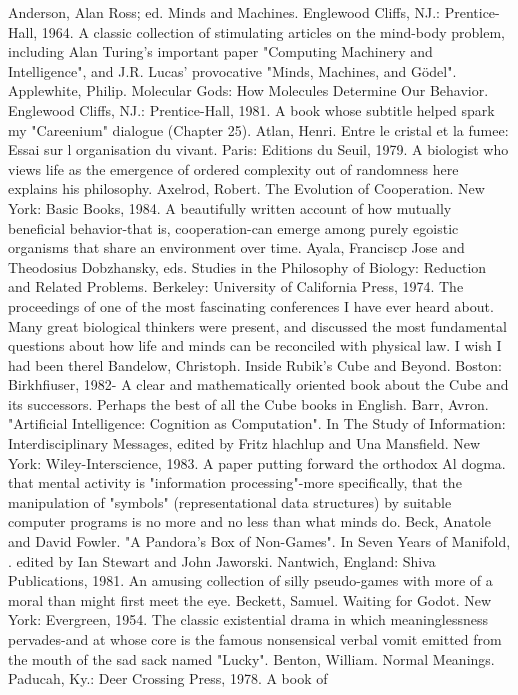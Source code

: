Anderson, Alan Ross; ed. Minds and Machines. Englewood Cliffs, NJ.: Prentice-Hall, 1964.
 A classic collection of stimulating articles on the mind-body problem, including Alan
 Turing's important paper "Computing Machinery and Intelligence", and J.R. Lucas'
 provocative "Minds, Machines, and Gödel".
Applewhite, Philip. Molecular Gods: How Molecules Determine Our Behavior. Englewood
 Cliffs, NJ.: Prentice-Hall, 1981. A book whose subtitle helped spark my "Careenium"
 dialogue (Chapter 25).
Atlan, Henri. Entre le cristal et la fumee: Essai sur l organisation du vivant. Paris: Editions du
 Seuil, 1979. A biologist who views life as the emergence of ordered complexity out of
 randomness here explains his philosophy.
Axelrod, Robert. The Evolution of Cooperation. New York: Basic Books, 1984. A beautifully
 written account of how mutually beneficial behavior-that is, cooperation-can emerge among
 purely egoistic organisms that share an environment over time.
Ayala, Franciscp Jose and Theodosius Dobzhansky, eds. Studies in the Philosophy of
 Biology: Reduction and Related Problems. Berkeley: University of California Press, 1974.
 The proceedings of one of the most fascinating conferences I have ever heard about. Many
 great biological thinkers were present, and discussed the most fundamental questions about
 how life and minds can be reconciled with physical law. I wish I had been therel
Bandelow, Christoph. Inside Rubik's Cube and Beyond. Boston: Birkhfiuser, 1982- A clear
 and mathematically oriented book about the Cube and its successors. Perhaps the best of all
 the Cube books in English.
Barr, Avron. "Artificial Intelligence: Cognition as Computation". In The Study of
 Information: Interdisciplinary Messages, edited by Fritz hlachlup and Una Mansfield. New
 York: Wiley-Interscience, 1983. A paper putting forward the orthodox Al dogma. that
 mental activity is "information processing"-more specifically, that the manipulation of
 "symbols" (representational data structures) by suitable computer programs is no more and
 no less than what minds do.
Beck, Anatole and David Fowler. "A Pandora's Box of Non-Games". In Seven Years of
 Manifold, . edited by Ian Stewart and John Jaworski. Nantwich, England: Shiva
 Publications, 1981. An amusing collection of silly pseudo-games with more of a moral than
 might first meet the eye.
Beckett, Samuel. Waiting for Godot. New York: Evergreen, 1954. The classic existential
 drama in which meaninglessness pervades-and at whose core is the famous nonsensical
 verbal vomit emitted from the mouth of the sad sack named "Lucky".
Benton, William. Normal Meanings. Paducah, Ky.: Deer Crossing Press, 1978. A book of

